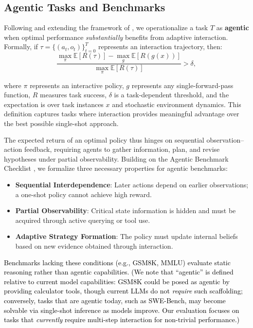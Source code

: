 \subsection{Agentic Tasks and Benchmarks}

Following and extending the framework of \citet{zhu2025establishing}, we operationalize a task $T$ as \textbf{agentic} when optimal performance \emph{substantially} benefits from adaptive interaction. Formally, if $\tau = \{(a_t, o_t)\}_{t=0}^T$ represents an interaction trajectory, then:
\[
\frac{\max_{\pi} \mathbb{E}[R(\tau)] - \max_{g} \mathbb{E}[R(g(x))]}{\max_{\pi} \mathbb{E}[R(\tau)]} > \delta,
\]

where $\pi$ represents an interactive policy, $g$ represents any single-forward-pass function, $R$ measures task success, $\delta$ is a task-dependent threshold, and the expectation is over task instances $x$ and stochastic environment dynamics. This definition captures tasks where interaction provides meaningful advantage over the best possible single-shot approach.

The expected return of an optimal policy thus hinges on sequential observation–action feedback, requiring agents to gather information, plan, and revise hypotheses under partial observability. Building on the Agentic Benchmark Checklist \citep{zhu2025establishing}, we formalize three necessary properties for agentic benchmarks:

\begin{itemize}
    \item \textbf{Sequential Interdependence}: Later actions depend on earlier observations; a one-shot policy cannot achieve high reward.  
    \item \textbf{Partial Observability}: Critical state information is hidden and must be acquired through active querying or tool use.  
    \item \textbf{Adaptive Strategy Formation}: The policy must update internal beliefs based on new evidence obtained through interaction.
\end{itemize}

\textcolor{black}{\noindent Benchmarks lacking these conditions (e.g., GSM8K, MMLU) evaluate static reasoning rather than agentic capabilities. (We note that ``agentic'' is defined relative to current model capabilities: GSM8K could be posed as agentic by providing calculator tools, though current LLMs do not \emph{require} such scaffolding; conversely, tasks that are agentic today, such as SWE-Bench, may become solvable via single-shot inference as models improve. Our evaluation focuses on tasks that \emph{currently} require multi-step interaction for non-trivial performance.)}


